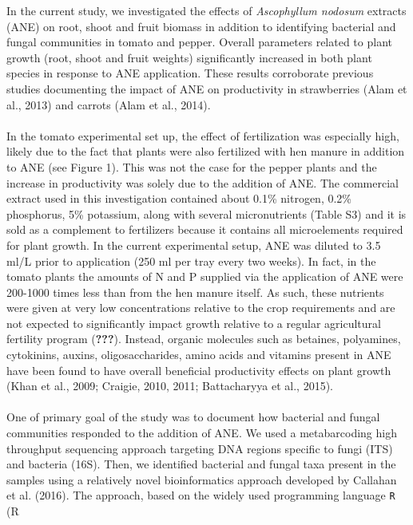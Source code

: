 \documentclass[12pt,]{article}
\begin{document}
In the current study, we investigated the effects of \emph{Ascophyllum
nodosum} extracts (ANE) on root, shoot and fruit biomass in addition to
identifying bacterial and fungal communities in tomato and pepper.
Overall parameters related to plant growth (root, shoot and fruit
weights) significantly increased in both plant species in response to
ANE application. These results corroborate previous studies documenting
the impact of ANE on productivity in strawberries (Alam et al., 2013)
and carrots (Alam et al., 2014).\\
\hspace*{0.333em}\\
In the tomato experimental set up, the effect of fertilization was
especially high, likely due to the fact that plants were also fertilized
with hen manure in addition to ANE (see Figure 1). This was not the case
for the pepper plants and the increase in productivity was solely due to
the addition of ANE. The commercial extract used in this investigation
contained about 0.1\% nitrogen, 0.2\% phosphorus, 5\% potassium, along
with several micronutrients (Table S3) and it is sold as a complement to
fertilizers because it contains all microelements required for plant
growth. In the current experimental setup, ANE was diluted to 3.5 ml/L
prior to application (250 ml per tray every two weeks). In fact, in the
tomato plants the amounts of N and P supplied via the application of ANE
were 200-1000 times less than from the hen manure itself. As such, these
nutrients were given at very low concentrations relative to the crop
requirements and are not expected to significantly impact growth
relative to a regular agricultural fertility program ({\textbf{???}}).
Instead, organic molecules such as betaines, polyamines, cytokinins,
auxins, oligosaccharides, amino acids and vitamins present in ANE have
been found to have overall beneficial productivity effects on plant
growth (Khan et al., 2009; Craigie, 2010, 2011; Battacharyya et al.,
2015).\\
\hspace*{0.333em}\\
One of primary goal of the study was to document how bacterial and
fungal communities responded to the addition of ANE. We used a
metabarcoding high throughput sequencing approach targeting DNA regions
specific to fungi (ITS) and bacteria (16S). Then, we identified
bacterial and fungal taxa present in the samples using a relatively
novel bioinformatics approach developed by Callahan et al. (2016). The
approach, based on the widely used programming language \texttt{R} (R
\end{document}

